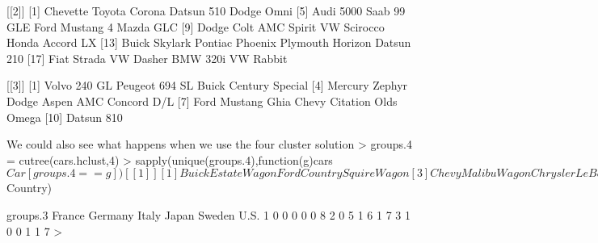 {[[2]]
 [1] Chevette         Toyota Corona    Datsun 510       Dodge Omni
 [5] Audi 5000        Saab 99 GLE      Ford Mustang 4   Mazda GLC
 [9] Dodge Colt       AMC Spirit       VW Scirocco      Honda Accord LX
[13] Buick Skylark    Pontiac Phoenix  Plymouth Horizon Datsun 210
[17] Fiat Strada      VW Dasher        BMW 320i         VW Rabbit

[[3]]
 [1] Volvo 240 GL          Peugeot 694 SL        Buick Century Special
 [4] Mercury Zephyr        Dodge Aspen           AMC Concord D/L
 [7] Ford Mustang Ghia     Chevy Citation        Olds Omega
[10] Datsun 810


We could also see what happens when we use the four cluster solution
> groups.4 = cutree(cars.hclust,4)
> sapply(unique(groups.4),function(g)cars$Car[groups.4 == g])
[[1]]
[1] Buick Estate Wagon        Ford Country Squire Wagon
[3] Chevy Malibu Wagon        Chrysler LeBaron Wagon
[5] Chevy Caprice Classic     Ford LTD
[7] Mercury Grand Marquis     Dodge St Regis

[[2]]
 [1] Chevette         Toyota Corona    Datsun 510       Dodge Omni
 [5] Ford Mustang 4   Mazda GLC        Dodge Colt       AMC Spirit
 [9] VW Scirocco      Honda Accord LX  Buick Skylark    Pontiac Phoenix
[13] Plymouth Horizon Datsun 210       Fiat Strada      VW Dasher
[17] VW Rabbit

[[3]]
[1] Audi 5000   Saab 99 GLE BMW 320i

[[4]]
 [1] Volvo 240 GL          Peugeot 694 SL        Buick Century Special
 [4] Mercury Zephyr        Dodge Aspen           AMC Concord D/L
 [7] Ford Mustang Ghia     Chevy Citation        Olds Omega
[10] Datsun 810


The new cluster can be recognized as the third group in the above output.
Often there is an auxiliary variable in the original data set that was not included in the cluster analysis, but may be of interest. In fact, cluster analysis is sometimes performed to see if observations naturally group themselves in accord with some already measured variable. For this data set, we could ask whether the clusters reflect the country of origin of the cars, stored in the variable Country in the original data set. The table function can be used, this time passing two arguments, to produce a cross-tabulation of cluster group membership and country of origin:
> table(groups.3,cars$Country)

groups.3 France Germany Italy Japan Sweden U.S.
       1      0       0     0     0      0    8
       2      0       5     1     6      1    7
       3      1       0     0     1      1    7
>                                                 

}
